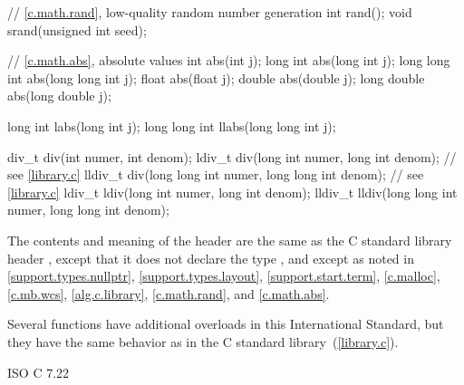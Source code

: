 \begin{codeblock}
{  // \ref{c.math.rand}, low-quality random number generation
  int rand();
  void srand(unsigned int seed);

  // \ref{c.math.abs}, absolute values
  int abs(int j);
  long int abs(long int j);
  long long int abs(long long int j);
  float abs(float j);
  double abs(double j);
  long double abs(long double j);

  long int labs(long int j);
  long long int llabs(long long int j);

  div_t div(int numer, int denom);
  ldiv_t div(long int numer, long int denom);  // see \ref{library.c}
  lldiv_t div(long long int numer, long long int denom);  // see \ref{library.c}
  ldiv_t ldiv(long int numer, long int denom);
  lldiv_t lldiv(long long int numer, long long int denom);
}
\end{codeblock}

\pnum
The contents and meaning of the header  are the same as
the C standard library header ,
except that it does not declare the type ,
and except as noted in
\ref{support.types.nullptr},
\ref{support.types.layout},
\ref{support.start.term},
\ref{c.malloc},
\ref{c.mb.wcs},
\ref{alg.c.library},
\ref{c.math.rand}, and
\ref{c.math.abs}.
\begin{note}
Several functions have additional overloads in this International Standard,
but they have the same behavior as in the C standard library~(\ref{library.c}).
\end{note}

\xref ISO C 7.22
